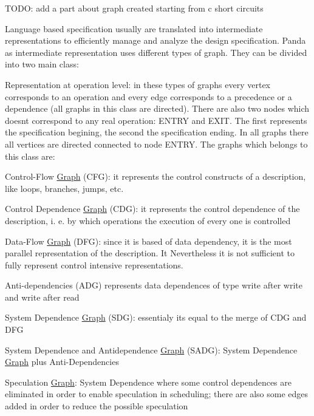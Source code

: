 T\+O\+DO\+: add a part about graph created starting from c short circuits

Language based specification usually are translated into intermediate representations to efficiently manage and analyze the design specification. Panda as intermediate representation uses different types of graph. They can be divided into two main class\+:


\begin{DoxyItemize}
\item Representation at operation level\+: in these types of graphs every vertex corresponds to an operation and every edge corresponds to a precedence or a dependence (all graphs in this class are directed). There are also two nodes which doesn\textquotesingle{}t correspond to any real operation\+: E\+N\+T\+RY and E\+X\+IT. The first represents the specification begining, the second the specification ending. In all graphs there all vertices are directed connected to node E\+N\+T\+RY. The graphs which belongs to this class are\+:
\begin{DoxyItemize}
\item Control-\/\+Flow \hyperlink{structGraph}{Graph} (C\+FG)\+: it represents the control constructs of a description, like loops, branches, jumps, etc.
\item Control Dependence \hyperlink{structGraph}{Graph} (C\+DG)\+: it represents the control dependence of the description, i. e. by which operations the execution of every one is controlled
\item Data-\/\+Flow \hyperlink{structGraph}{Graph} (D\+FG)\+: since it is based of data dependency, it is the most parallel representation of the description. It Nevertheless it is not sufficient to fully represent control intensive representations.
\item Anti-\/dependencies (A\+DG) represents data dependences of type write after write and write after read
\item System Dependence \hyperlink{structGraph}{Graph} (S\+DG)\+: essentialy it\textquotesingle{}s equal to the merge of C\+DG and D\+FG
\item System Dependence and Antidependence \hyperlink{structGraph}{Graph} (S\+A\+DG)\+: System Dependence \hyperlink{structGraph}{Graph} plus Anti-\/\+Dependencies
\item Speculation \hyperlink{structGraph}{Graph}\+: System Dependence where some control dependences are eliminated in order to enable speculation in scheduling; there are also some edges added in order to reduce the possible speculation

\end{DoxyItemize}
\end{DoxyItemize}
